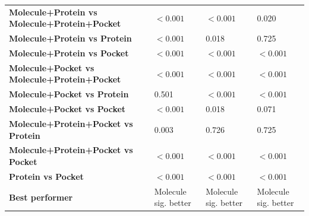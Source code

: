 \begin{table}[H]
{\begin{tabular}{llll}
        \textbf{Molecule+Protein vs Molecule+Protein+Pocket} & $< 0.001$ & $< 0.001$ & 0.020 \\
        \textbf{Molecule+Protein vs Protein} & $< 0.001$ & 0.018 & 0.725 \\
        \textbf{Molecule+Protein vs Pocket} & $< 0.001$ & $< 0.001$ & $< 0.001$ \\
        \textbf{Molecule+Pocket vs Molecule+Protein+Pocket} & $< 0.001$ & $< 0.001$ & $< 0.001$ \\
        \textbf{Molecule+Pocket vs Protein} & 0.501 & $< 0.001$ & $< 0.001$ \\
        \textbf{Molecule+Pocket vs Pocket} & $< 0.001$ & 0.018 & 0.071 \\
        \textbf{Molecule+Protein+Pocket vs Protein} & 0.003 & 0.726 & 0.725 \\
        \textbf{Molecule+Protein+Pocket vs Pocket} & $< 0.001$ & $< 0.001$ & $< 0.001$ \\
        \textbf{Protein vs Pocket} & $< 0.001$ & $< 0.001$ & $< 0.001$ \\
        \textbf{Best performer} & Molecule sig. better & Molecule sig. better & Molecule sig. better \\
        \bottomrule
    \end{tabular}}
\end{table}